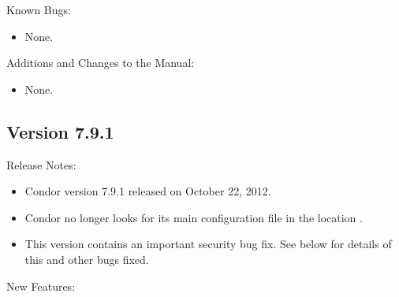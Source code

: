 \noindent Known Bugs:

\begin{itemize}

\item None.

\end{itemize}

\noindent Additions and Changes to the Manual:

\begin{itemize}

\item None.

\end{itemize}


\subsection*{\label{sec:New-7-9-1}Version 7.9.1}

\noindent Release Notes:

\begin{itemize}

\item Condor version 7.9.1 released on October 22, 2012.

\item Condor no longer looks for its main configuration file in the
location .

\item \Security This version contains an important security bug fix.  See below
for details of this and other bugs fixed.

\end{itemize}


\noindent New Features:

